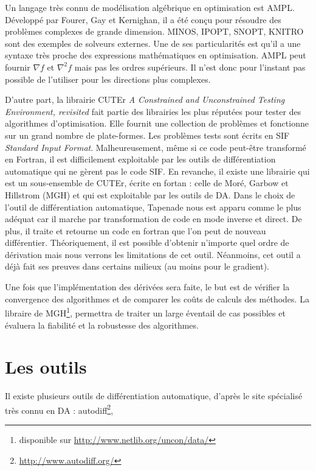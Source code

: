 



Un langage tr\`es connu de mod\'elisation alg\'ebrique en optimisation est AMPL. D\'evelopp\'e par Fourer, Gay et 
Kernighan, il a \'et\'e conçu pour r\'esoudre des probl\`emes complexes de grande dimension. MINOS, IPOPT, 
SNOPT, KNITRO sont des exemples de solveurs externes. Une de ses particularit\'es est qu'il a une syntaxe tr\`es proche des
expressions math\'ematiques en optimisation. 
AMPL peut fournir $\nabla f$ et $\nabla^2 f$ mais pas les ordres sup\'erieurs. Il n'est donc pour l'instant pas possible de l'utiliser 
pour les directions plus complexes.




D'autre part, la librairie CUTEr  {\it A Constrained and Unconstrained Testing Environment, revisited}
fait partie des librairies les plus r\'eput\'ees pour tester des algorithmes d'optimisation.
 Elle fournit une collection de probl\`emes et fonctionne sur un grand nombre de plate-formes. 
Les probl\`emes tests sont \'ecrits en SIF  {\it Standard Input Format}.
Malheureusement, même si ce code peut-être transform\'e en Fortran, il est difficilement exploitable par les outils
de diff\'erentiation automatique qui ne g\`erent pas le code SIF.
En revanche, il existe une librairie qui est un sous-ensemble de CUTEr, \'ecrite en fortan : celle de Mor\'e, Garbow et Hillstrom (MGH) \cite{355936} 
et qui est exploitable par les outils de DA.
 Dans le choix de l'outil de diff\'erentiation automatique, Tapenade nous est apparu comme le plus ad\'equat car il marche
par transformation de code en mode inverse et direct. De plus, il traite et retourne un code en fortran que l'on peut de nouveau diff\'erentier.
 Th\'eoriquement, il est possible d'obtenir n'importe quel ordre de d\'erivation mais nous verrons les limitations de cet outil. N\'eanmoins, 
 cet outil a d\'ej\`a fait ses preuves dans certains milieux (au moins pour le gradient).

Une fois que l'impl\'ementation des d\'eriv\'ees sera faite, le but est de v\'erifier la convergence des algorithmes
 et de comparer les coûts de calculs des m\'ethodes.
La libraire de MGH\footnote{disponible sur \url{http://www.netlib.org/uncon/data/}}, permettra de traiter un large \'eventail de cas possibles et \'evaluera la fiabilit\'e et la robustesse des algorithmes.




\section{Les outils}
Il existe plusieurs outils de diff\'erentiation automatique, d'apr\`es le site sp\'ecialis\'e tr\`es connu en DA : autodiff\footnote{\url{http://www.autodiff.org/}},


